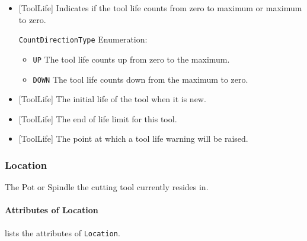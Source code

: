 \begin{itemize}

\item {}[ToolLife] \newline Indicates if the tool life counts from zero to maximum or maximum to zero.

\texttt{CountDirectionType} Enumeration:

\begin{itemize}
\item \texttt{UP} \newline The tool life counts up from zero to the maximum.
 
\item \texttt{DOWN} \newline The tool life counts down from the maximum to zero. 
\end{itemize}


\item {}[ToolLife] \newline The initial life of the tool when it is new.

\item {}[ToolLife] \newline The end of life limit for this tool.

\item {}[ToolLife] \newline The point at which a tool life warning will be raised.
\end{itemize}



\subsubsection{Location}
\label{sec:Location}



The Pot or Spindle the cutting tool currently resides in.


\paragraph{Attributes of Location}\mbox{}
\label{sec:Attributes of Location}

 lists the attributes of \texttt{Location}.

